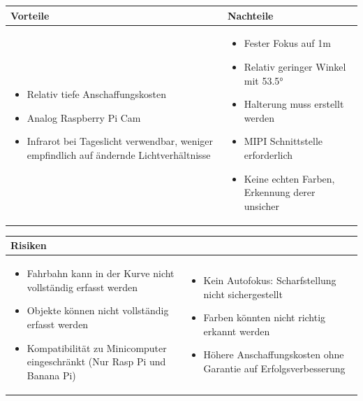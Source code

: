 \begin{table}[h]
\begin{tabular}{p{} | p{}}


 \textbf{Vorteile} & \textbf{Nachteile} \\ \hline
	 
\begin{itemize}
\item Relativ tiefe Anschaffungskosten
\item Analog Raspberry Pi Cam
\item Infrarot bei Tageslicht verwendbar, weniger empfindlich auf ändernde Lichtverhältnisse
\end{itemize}

 
 &
 
\begin{itemize}
\item Fester Fokus auf 1m
\item Relativ geringer Winkel mit 53.5°
\item Halterung muss erstellt werden
\item MIPI Schnittstelle erforderlich
\item Keine echten Farben, Erkennung derer unsicher
\end{itemize}

\end{tabular}
\end{table}

\begin{table}[h]
\begin{tabular}{p{}p{}}


 \textbf{Risiken} & \\ \hline
	 
\begin{itemize}
\item Fahrbahn kann in der Kurve nicht vollständig erfasst werden
\item Objekte können nicht vollständig erfasst werden
\item Kompatibilität zu Minicomputer eingeschränkt (Nur Rasp Pi und Banana Pi)
\end{itemize}
&
\begin{itemize}
\item Kein Autofokus: Scharfstellung nicht sichergestellt
\item Farben könnten nicht richtig erkannt werden
\item Höhere Anschaffungskosten ohne Garantie auf Erfolgsverbesserung
\end{itemize}

 
\end{tabular}
\end{table}

